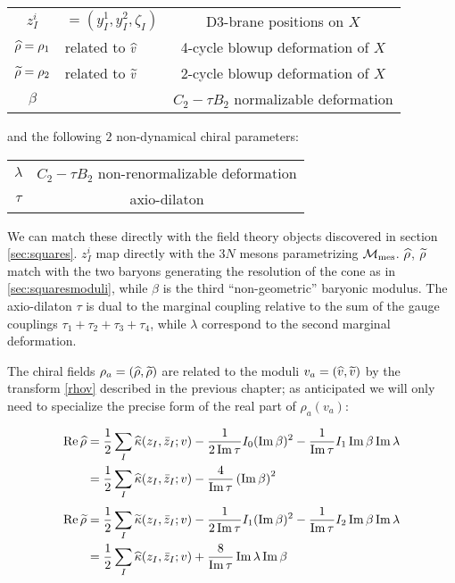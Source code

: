\begin{center}\begin{tabular}{c | l c}
	$z_I^i$ & $= (y_I^1, y_I^2, \zeta_I)$ & D3-brane positions on $X$\\
	$\widehat{\rho} = \rho_1$ & related to $\widehat{v}$ & 4-cycle blowup deformation of $X$\\
	$\widetilde{\rho} = \rho_2$ & related to $\widetilde{v}$ & 2-cycle blowup deformation of $X$\\
	$\beta$ &  & $C_2 - \tau B_2$ normalizable deformation
\end{tabular}\end{center}


and the following $2$ non-dynamical chiral parameters:

\begin{center}
\begin{tabular}{c | c}
	$\lambda$ &  $C_2 - \tau B_2$ non-renormalizable deformation\\
	$\tau$ &  axio-dilaton
\end{tabular}\end{center}

We can match these directly with the field theory objects discovered in section \ref{sec:squares}. $z_I^i$ map directly with the $3N$ mesons parametrizing $\mathcal{M}_\mathrm{mes}$. $\widehat{\rho}$, $\widetilde{\rho}$ match with the two baryons generating the resolution of the cone as in \ref{sec:squaresmoduli}, while $\beta$ is the third ``non-geometric'' baryonic modulus. The axio-dilaton $\tau$ is dual to the marginal coupling relative to the sum of the gauge couplings $\tau_1 + \tau_2 + \tau_3 + \tau_4$, while $\lambda$ correspond to the second marginal deformation.

The chiral fields $\rho_a = (\widehat{\rho},\widetilde{\rho})$ are related to the moduli $v_a = (\widehat{v}, \widetilde{v})$ by the transform \eqref{rhov} described in the previous chapter; as anticipated we will only need to specialize the precise form of the real part of $\rho_a(v_a)$:

\begin{align}
\begin{split}
	\operatorname{Re} \widehat{\rho} &= \frac{1}{2} \sum_I \widehat{\kappa}(z_I,\bar z_I ; v)  - \frac{1}{2\operatorname{Im} \tau} I_0 (\operatorname{Im} \beta)^2 - \frac{1}{\operatorname{Im} \tau} I_1 \operatorname{Im} \beta \operatorname{Im} \lambda\\
	&= \frac{1}{2} \sum_I \widehat{\kappa}(z_I,\bar z_I; v) -\frac{4}{\operatorname{Im}\tau} \left( \operatorname{Im}\beta \right)^2
	\label{rhofunv}
\end{split}
\end{align}
\begin{align}
\begin{split}
	\operatorname{Re} \widetilde{\rho} &= \frac{1}{2} \sum_I \widetilde{\kappa}(z_I,\bar z_I; v) - \frac{1}{2 \operatorname{Im} \tau}I_1(\operatorname{Im}\beta)^2-\frac{1}{\operatorname{Im}\tau}I_2 \operatorname{Im}\beta \operatorname{Im}\lambda\\
	&= \frac{1}{2} \sum_I \widehat{\kappa}(z_I,\bar z_I; v) + \frac{8}{\operatorname{Im}\tau} \operatorname{Im}\lambda \operatorname{Im}\beta 
	\label{}
\end{split}
\end{align}

